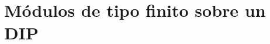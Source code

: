 \documentclass{article}
\theoremstyle{theorem-style}  %
\theoremstyle{definition}
\theoremstyle{example-style}
\begin{document}
\maketitle
\tikzset{node distance=2cm, auto}


\newpage
\tableofcontents
\newpage


\section{Módulos de tipo finito sobre un DIP}
\end{document}
